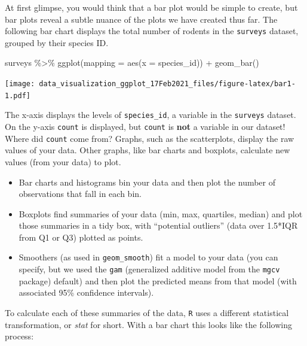 \documentclass[
]{article}
\newenvironment{Shaded}{\begin{snugshade}}{\end{snugshade}}
\newcommand{\AttributeTok}[1]{\textcolor[rgb]{0.77,0.63,0.00}{#1}}
\newcommand{\FunctionTok}[1]{\textcolor[rgb]{0.00,0.00,0.00}{#1}}
\newcommand{\NormalTok}[1]{#1}
\newcommand{\SpecialCharTok}[1]{\textcolor[rgb]{0.00,0.00,0.00}{#1}}
\begin{document}
At first glimpse, you would think that a bar plot would be simple to
create, but bar plots reveal a subtle nuance of the plots we have
created thus far. The following bar chart displays the total number of
rodents in the \texttt{surveys} dataset, grouped by their species ID.

\begin{Shaded}
\begin{Highlighting}[]
\NormalTok{surveys }\SpecialCharTok{\%\textgreater{}\%} 
  \FunctionTok{ggplot}\NormalTok{(}\AttributeTok{mapping =} \FunctionTok{aes}\NormalTok{(}\AttributeTok{x =}\NormalTok{ species\_id)) }\SpecialCharTok{+} 
  \FunctionTok{geom\_bar}\NormalTok{()}
\end{Highlighting}
\end{Shaded}

\texttt{[image: data\_visualization\_ggplot\_17Feb2021\_files/figure-latex/bar1-1.pdf]}

The x-axis displays the levels of \texttt{species\_id}, a variable in
the \texttt{surveys} dataset. On the y-axis \texttt{count} is displayed,
but \texttt{count} is \textbf{not} a variable in our dataset! Where did
\texttt{count} come from? Graphs, such as the scatterplots, display the
raw values of your data. Other graphs, like bar charts and boxplots,
calculate new values (from your data) to plot.

\begin{itemize}
\item
  Bar charts and histograms bin your data and then plot the number of
  observations that fall in each bin.
\item
  Boxplots find summaries of your data (min, max, quartiles, median) and
  plot those summaries in a tidy box, with ``potential outliers'' (data
  over 1.5*IQR from Q1 or Q3) plotted as points.
\item
  Smoothers (as used in \texttt{geom\_smooth}) fit a model to your data
  (you can specify, but we used the \texttt{gam} (generalized additive
  model from the \texttt{mgcv} package) default) and then plot the
  predicted means from that model (with associated 95\% confidence
  intervals).
\end{itemize}

To calculate each of these summaries of the data, \texttt{R} uses a
different statistical transformation, or \emph{stat} for short. With a
bar chart this looks like the following process:
\end{document}
